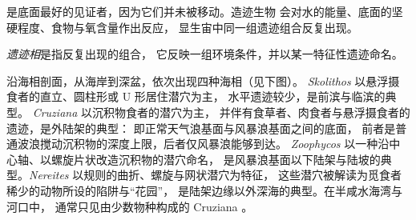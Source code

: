 是底面最好的见证者，因为它们并未被移动。造迹生物
会对水的能量、底面的坚硬程度、食物与氧含量作出反应，
显生宙中同一组遗迹组合反复出现。

\begin{definition}[遗迹相]\label{def:b2:palaeoenvironments:ichnofacies}
\emph{遗迹相}是指反复出现的组合，
它反映一组环境条件，并以某一特征性遗迹命名。
\end{definition}

沿海相剖面，从海岸到深盆，依次出现四种海相（见下图）。
\emph{Skolithos} 以悬浮摄食者的直立、圆柱形或 U 形居住潜穴为主，
水平遗迹较少，是前滨与临滨的典型。
\emph{Cruziana} 以沉积物食者的潜穴为主，
并伴有食草者、肉食者与悬浮摄食者的遗迹，是外陆架的典型：
即正常天气浪基面与风暴浪基面之间的底面，
前者是普通波浪搅动沉积物的深度上限，后者仅风暴浪能够到达。
\emph{Zoophycos} 以一种沿中心轴、以螺旋片状改造沉积物的潜穴命名，
是风暴浪基面以下陆架与陆坡的典型。\emph{Nereites} 以规则的曲折、螺旋与网状潜穴为特征，
这些潜穴被解读为觅食者稀少的动物所设的陷阱与“花园”，
是陆架边缘以外深海的典型。在半咸水海湾与河口中，
通常只见由少数物种构成的 Cruziana 。

